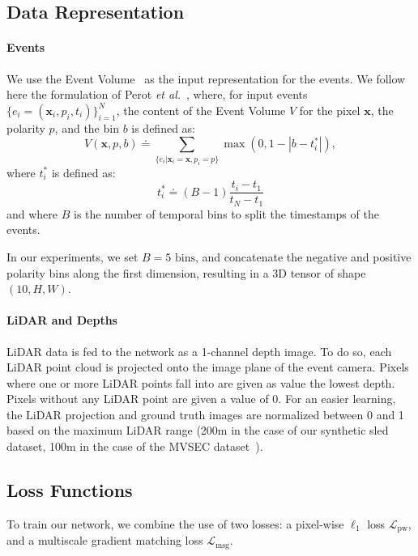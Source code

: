 \subsection{Data Representation}

\paragraph{Events}
We use the Event Volume~\cite{Zhu2019UnsupervisedEL} as the input representation for the events. We follow here the formulation of Perot \textit{et al.}~\cite{Perot2020LearningTD}, where, for input events \(\{e_i = (\mathbf{x}_i, p_i, t_i)\}_{i=1}^N\), the content of the Event Volume \(V\) for the pixel \(\mathbf{x}\), the polarity \(p\), and the bin \(b\) is defined as:
\begin{equation}
V(\mathbf{x}, p, b) \doteq \sum_{\{e_i | \mathbf{x}_i=\mathbf{x}, p_i=p\}} \max(0, 1-|b-t_i^*|),
\end{equation}
where \(t_i^*\) is defined as:
\begin{equation}
t_i^* \doteq (B-1)\frac{t_i-t_1}{t_N-t_1}
\end{equation}
and where \(B\) is the number of temporal bins to split the timestamps of the events.

In our experiments, we set \(B=5\text{ bins}\), and concatenate the negative and positive polarity bins along the first dimension, resulting in a 3D tensor of shape \((10, H, W)\).

\paragraph{LiDAR and Depths}
LiDAR data is fed to the network as a 1-channel depth image. To do so, each LiDAR point cloud is projected onto the image plane of the event camera. Pixels where one or more LiDAR points fall into are given as value the lowest depth. Pixels without any LiDAR point are given a value of 0. For an easier learning, the LiDAR projection and ground truth images are normalized between 0 and 1 based on the maximum LiDAR range (200m in the case of our synthetic \acrshort{sled} dataset, 100m in the case of the MVSEC dataset~\cite{Zhu2018TheMS}).

\subsection{Loss Functions}\label{sec:aled:method:loss}
To train our network, we combine the use of two losses: a pixel-wise \(\ell_1\) loss \(\mathcal{L}_\text{pw}\), and a multiscale gradient matching loss \(\mathcal{L}_\text{msg}\).

